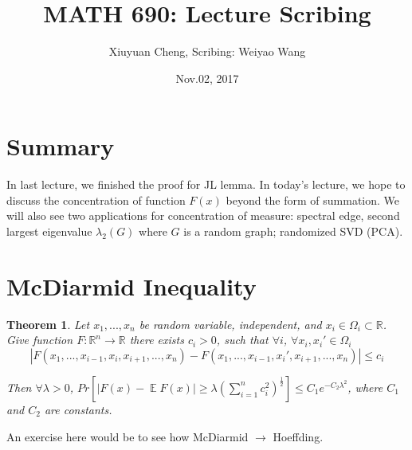 \documentclass[11pt,letter]{article}
\DeclareMathOperator{\E}{\mathbb{E}}
\newtheorem{theorem}{Theorem}
\begin{document}
\title{MATH 690: Lecture Scribing}

\author{Xiuyuan Cheng, Scribing: Weiyao Wang}

\date{Nov.02, 2017}

\maketitle

\section{Summary}

In last lecture, we finished the proof for JL lemma. In today's lecture, we hope to discuss the concentration of function $F(x)$ beyond the form of summation. We will also see two applications for concentration of measure: spectral edge, second largest eigenvalue $\lambda_2(G)$ where $G$ is a random graph; randomized SVD (PCA).

\section{McDiarmid Inequality}

\begin{theorem}
Let $x_1,...,x_n$ be random variable, independent, and $x_i\in \Omega_i\subset \mathbb{R}$. Give function $F: \mathbb{R}^n\to \mathbb{R}$ there exists $c_i>0$, such that $\forall i$, $\forall x_i, x_i'\in \Omega_i$
$$|F(x_1,...,x_{i-1},x_i,x_{i+1},...,x_n)-F(x_1,...,x_{i-1},x_i',x_{i+1},...,x_n)|\leq c_i$$

Then $\forall \lambda>0$, $Pr[|F(x)-\E F(x)|\geq \lambda (\sum_{i=1}^n c_i^2)^{\frac{1}{2}}]\leq C_1e^{-C_2\lambda^2}$, where $C_1$ and $C_2$ are constants.
\end{theorem}

An exercise here would be to see how McDiarmid $\to$ Hoeffding.
\end{document}
